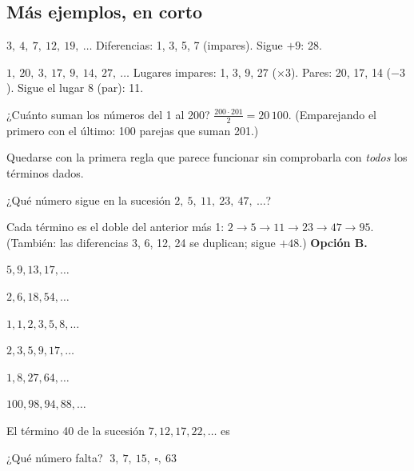 \subsection{Más ejemplos, en corto}
\begin{ejemplo}
$3,\ 4,\ 7,\ 12,\ 19,\ \ldots$
\solucion Diferencias: 1, 3, 5, 7 (impares). Sigue $+9$: 28.
\end{ejemplo}

\begin{ejemplo}[Intercaladas]
$1,\ 20,\ 3,\ 17,\ 9,\ 14,\ 27,\ \ldots$
\solucion Lugares impares: 1, 3, 9, 27 ($\times 3$). Pares: 20, 17, 14 ($-3$). Sigue el lugar 8 (par): 11.
\end{ejemplo}

\begin{ejemplo}
¿Cuánto suman los números del 1 al 200?
\solucion $\tfrac{200 \cdot 201}{2} = 20\,100$. (Emparejando el primero con el último: 100 parejas que suman 201.)
\end{ejemplo}

\begin{trampa}
Quedarse con la primera regla que parece funcionar sin comprobarla con \emph{todos} los términos dados.
\end{trampa}

\begin{reto}
¿Qué número sigue en la sucesión $2,\ 5,\ 11,\ 23,\ 47,\ \ldots$?
\end{reto}

\begin{retoresuelto}
Cada término es el doble del anterior más 1: $2 \to 5 \to 11 \to 23 \to 47 \to 95$. (También: las diferencias 3, 6, 12,
24 se duplican; sigue $+48$.) \textbf{Opción B.}
\end{retoresuelto}

\taller
{}
\begin{ejercicios}[2]
\item $5, 9, 13, 17, \ldots$ 
\item $2, 6, 18, 54, \ldots$ 
\item $1, 1, 2, 3, 5, 8, \ldots$ 
\item $2, 3, 5, 9, 17, \ldots$ 
\item $1, 8, 27, 64, \ldots$ 
\item $100, 98, 94, 88, \ldots$ 
\end{ejercicios}
\begin{ejercicios}
\item El término 40 de la sucesión $7, 12, 17, 22, \ldots$ es
\item ¿Qué número falta? $\;3,\ 7,\ 15,\ \square,\ 63$
\end{ejercicios}

